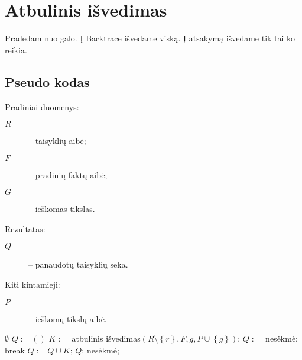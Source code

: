 \chapter{Atbulinis išvedimas}

Pradedam nuo galo. Į Backtrace išvedame viską. Į atsakymą išvedame tik tai
ko reikia.

\section{Pseudo kodas}

\label{sec:bc:pseudo}

Pradiniai duomenys:
\begin{description}
  \item[$R$] – taisyklių aibė;
  \item[$F$] – pradinių faktų aibė;
  \item[$G$] – ieškomas tikslas.
\end{description}

Rezultatas:
\begin{description}
  \item[$Q$] – panaudotų taisyklių seka.
\end{description}

Kiti kintamieji:
\begin{description}
  \item[$P$] – ieškomų tikslų aibė.
\end{description}

\begin{algorithmic}[1]
      \State \Return $\emptyset$
    \Else
        \State $Q := \left( \right)$
          \State $K := $ atbulinis išvedimas$(%
            R\setminus \left\{ r \right\}, F, g,%
            P \cup \left\{ g \right\})$;
            \State $Q :=$ nesėkmė;
            \State break
          \Else
            \State $Q := Q \cup K$;
          \EndIf
            \State \Return $Q$;
          \EndIf
        \EndFor
      \EndFor
      \State \Return nesėkmė;
    \EndIf
  \EndFunction
\end{algorithmic}
